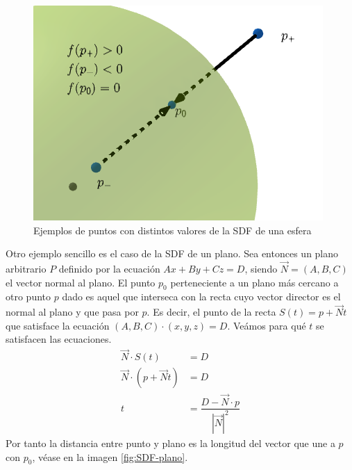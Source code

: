 \begin{figure} [ht]
    \centering
    \includegraphics[scale = 0.5]{img/C8/SDF-esfera.png}
    \caption{Ejemplos de puntos con distintos valores de la SDF de una esfera}
    \label{fig:SDF-esfera}
\end{figure}

Otro ejemplo sencillo es el caso de la SDF de un plano. Sea entonces un plano arbitrario $P$ definido por la ecuación $Ax+By+Cz = D$, siendo $\vec N=(A,B,C)$ el vector normal al plano. El punto $p_0$ perteneciente a un plano más cercano a otro punto $p$ dado es aquel que interseca con la recta cuyo vector director es el normal al plano y que pasa por $p$. Es decir, el punto de la recta $S(t)=p+\vec Nt$ que satisface la ecuación $(A,B,C)\cdot (x,y,z) = D$. Veámos para qué $t$ se satisfacen las ecuaciones.
\begin{equation}
    \label{eq:t-mas-cercano}
    \begin{split}
        \vec N\cdot S(t) &= D \\
        \vec N\cdot (p+\vec N t) &= D \\
        t &= \dfrac{D-\vec N \cdot p}{|\vec N|^2}
    \end{split}
\end{equation}
Por tanto la distancia entre punto y plano es la longitud del vector que une a $p$ con $p_0$, véase en la imagen \ref{fig:SDF-plano}.


